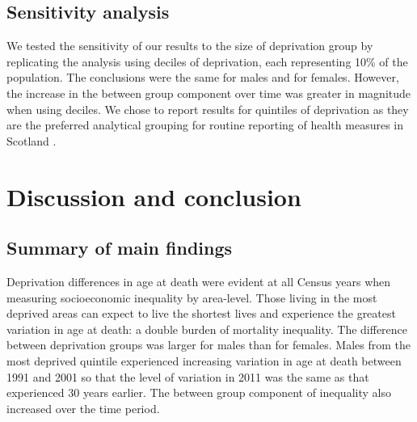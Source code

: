 \documentclass[12pt,oneside,a4paper]{article} %
\theoremstyle{definition}
\begin{document}
\FloatBarrier
\subsection{Sensitivity analysis}
We tested the sensitivity of our results to the size of deprivation group by
replicating the analysis using deciles of deprivation, each representing 10\% of
the population. The conclusions were the same for males and for females.
However, the increase in the between group component over time was greater in
magnitude when using deciles. We chose to report results for quintiles of
deprivation as they are the preferred analytical grouping for routine reporting
of health measures in Scotland \citep{Health2017}.

\section{Discussion and conclusion}

\subsection{Summary of main findings}
Deprivation differences in age at death were evident at all Census years when measuring socioeconomic inequality by area-level. Those living in the most deprived areas can expect to live the shortest lives and experience the greatest variation in age at death: a double burden of mortality inequality. The difference between deprivation groups was larger for males than for females. Males from the most deprived quintile experienced increasing variation in age at death between 1991 and 2001 so that the level of variation in 2011 was the same as that experienced 30 years earlier. The between group component of inequality also increased over the time period.
\end{document}
